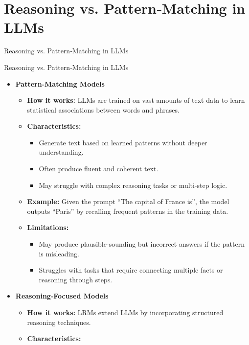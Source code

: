 \section{Reasoning vs. Pattern‑Matching in LLMs}
\begin{frame}{}
    \LARGE Reasoning vs. Pattern‑Matching in LLMs
\end{frame}

\begin{frame}[allowframebreaks]{Reasoning vs. Pattern‑Matching in LLMs}
    \begin{itemize}
        \item \textbf{Pattern-Matching Models}
        \begin{itemize}
            \item \textbf{How it works:} LLMs are trained on vast amounts of text data to learn statistical associations between words and phrases.
            \item \textbf{Characteristics:}
            \begin{itemize}
                \item Generate text based on learned patterns without deeper understanding.
                \item Often produce fluent and coherent text.
                \item May struggle with complex reasoning tasks or multi-step logic.
            \end{itemize}
            \item \textbf{Example:} Given the prompt ``The capital of France is'', the model outputs ``Paris'' by recalling frequent patterns in the training data.
            \item \textbf{Limitations:}
            \begin{itemize}
                \item May produce plausible-sounding but incorrect answers if the pattern is misleading.
                \item Struggles with tasks that require connecting multiple facts or reasoning through steps.
            \end{itemize}
        \end{itemize}
    \framebreak
        \item \textbf{Reasoning-Focused Models}
        \begin{itemize}
            \item \textbf{How it works:} LRMs extend LLMs by incorporating structured reasoning techniques.
            \item \textbf{Characteristics:}

\end{itemize}
\end{itemize}
\end{frame}
